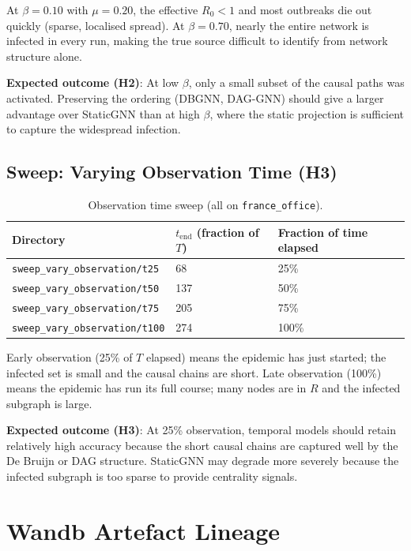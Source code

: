 \documentclass[12pt,a4paper]{report}
\begin{document}
At $\beta = 0.10$ with $\mu = 0.20$, the effective $R_0 < 1$ and most outbreaks
die out quickly (sparse, localised spread). At $\beta = 0.70$, nearly the entire
network is infected in every run, making the true source difficult to identify
from network structure alone.

\textbf{Expected outcome (H2)}: At low $\beta$, only a small subset of the
causal paths was activated. Preserving the ordering (DBGNN, DAG-GNN) should
give a larger advantage over StaticGNN than at high $\beta$, where the static
projection is sufficient to capture the widespread infection.

\subsection{Sweep: Varying Observation Time (H3)}

\begin{table}[H]
\centering
\caption{Observation time sweep (all on \texttt{france\_office}).}
\label{tab:obs_sweep}
\begin{tabular}{lll}
\toprule
Directory & $t_{\text{end}}$ (fraction of $T$) & Fraction of time elapsed \\
\midrule
\texttt{sweep\_vary\_observation/t25} & 68 & 25\% \\
\texttt{sweep\_vary\_observation/t50} & 137 & 50\% \\
\texttt{sweep\_vary\_observation/t75} & 205 & 75\% \\
\texttt{sweep\_vary\_observation/t100} & 274 & 100\% \\
\bottomrule
\end{tabular}
\end{table}

Early observation (25\% of $T$ elapsed) means the epidemic has just started;
the infected set is small and the causal chains are short. Late observation
(100\%) means the epidemic has run its full course; many nodes are in $R$ and
the infected subgraph is large.

\textbf{Expected outcome (H3)}: At 25\% observation, temporal models should
retain relatively high accuracy because the short causal chains are captured
well by the De Bruijn or DAG structure. StaticGNN may degrade more severely
because the infected subgraph is too sparse to provide centrality signals.

\section{Wandb Artefact Lineage}
\end{document}
